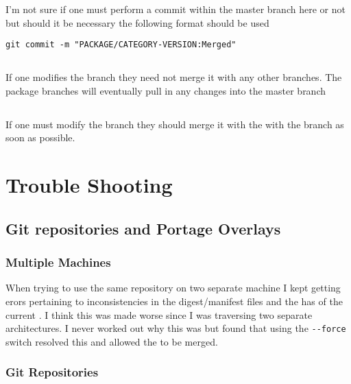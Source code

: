 \documentclass{article}
\begin{document}
I'm not sure if one must perform a commit within the master branch here or not but should it be necessary the following format should be used
\begin{lstlisting}
git commit -m "PACKAGE/CATEGORY-VERSION:Merged"
\end{lstlisting}

\subsection{}

If one modifies the  branch they need not merge it with any other branches. 
The package branches will eventually pull in any changes into the master branch

\subsection{}

If one must modify the  branch they should merge it with the with the  branch as soon as possible.

\section{Trouble Shooting}

\subsection{Git repositories and Portage Overlays} \label{ssec:issues:git}

\subsubsection{Multiple Machines}

When trying to use the same repository on two separate machine I kept getting erors pertaining to inconsistencies in the digest/manifest files and the has of the current .
I think this was made worse since I was traversing two separate architectures.
I never worked out why this was but found that using the \lstinline|--force| switch resolved this and allowed the  to be merged.

\subsubsection{Git Repositories}
\end{document}
